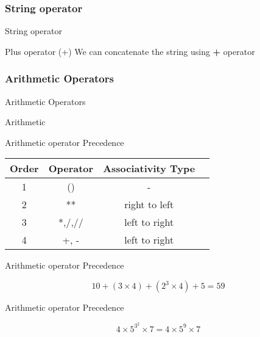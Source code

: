 \documentclass{beamer}
\begin{document}
\subsubsection{String operator}
\begin{frame}{String operator}
    \begin{block}{Plus operator (+)}
        We can concatenate the string using \textbf{+} operator
        
    \end{block}
\end{frame}

\subsubsection{Arithmetic Operators}
\begin{frame}{Arithmetic Operators}
    \begin{block}{Arithmetic}
        
    \end{block}
\end{frame}

\begin{frame}{Arithmetic operator Precedence}
    \centering
    \begin{tabular}{|c|c|c|c|}
        \hline
        Order & Operator & Associativity Type \\
        \hline
        1     & ()       & -                  \\
        \hline
        2     & **       & right to left      \\
        \hline
        3     & *,/,//   & left to right      \\
        \hline
        4     & +, -     & left to right      \\
        \hline
    \end{tabular}
\end{frame}

\begin{frame}{Arithmetic operator Precedence}
    \begin{example}
        
        $$
            10 + (3\times4) + (2^3 \times 4) + 5 = 59
        $$
    \end{example}
\end{frame}

\begin{frame}{Arithmetic operator Precedence}
    \begin{example}
        
        $$
            4 \times 5^{3^2} \times 7 = 4 \times 5^9 \times 7
        $$
    \end{example}
\end{frame}
\end{document}
